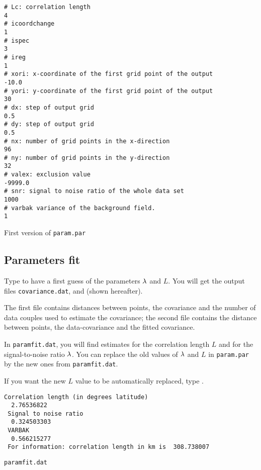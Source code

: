 \begin{exfile}[htpb]
\begin{footnotesize}
\begin{verbatim}
# Lc: correlation length 
4
# icoordchange 
1
# ispec 
3
# ireg 
1
# xori: x-coordinate of the first grid point of the output
-10.0
# yori: y-coordinate of the first grid point of the output
30
# dx: step of output grid
0.5
# dy: step of output grid
0.5
# nx: number of grid points in the x-direction
96
# ny: number of grid points in the y-direction
32
# valex: exclusion value
-9999.0
# snr: signal to noise ratio of the whole data set
1000
# varbak variance of the background field. 
1
\end{verbatim}
\end{footnotesize}
\caption{First version of \texttt{param.par}\label{paramfileCL}}
\end{exfile}


\subsection{Parameters fit}

Type  to have a first guess of the parameters $\lambda$ and $L$. You will get the output files \texttt{covariance.dat},  and    (shown hereafter). 

The first file contains distances between points, the covariance and the number of data couples used to estimate the covariance; the second file contains the distance between points, the data-covariance and the fitted covariance. 

In \texttt{paramfit.dat}, you will find estimates for the correlation length $L$ and for the signal-to-noise ratio $\lambda$. You can replace the old values of $\lambda$ and $L$ in \texttt{param.par} by the new ones from \texttt{paramfit.dat}.

If you want the new $L$ value to be automatically replaced, type .

\begin{exfile}[H]
\begin{footnotesize}
\begin{verbatim}
Correlation length (in degrees latitude)
  2.76536822
 Signal to noise ratio
  0.324503303
 VARBAK
  0.566215277
 For information: correlation length in km is  308.738007
\end{verbatim}
\end{footnotesize}
\caption{\texttt{paramfit.dat}}
\end{exfile}



